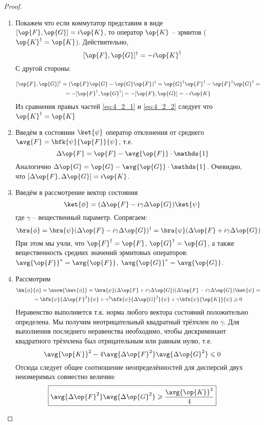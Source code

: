 \begin{proof}
\begin{enumerate}
\item Покажем что если коммутатор представим в виде $[\op{F},\op{G}]=i\op{K}$, то оператор $\op{K}$ -- эрмитов ($\op{K}^\dag=\op{K}$). Действительно,
\begin{equation}
  \label{eq:4_2_1}
  [\op{F},\op{G}]^\dag=-i\op{K}^\dag
\end{equation}%
%
С другой стороны:

\begin{equation}
\begin{gathered}
  \label{eq:4_2_2}
  [\op{F},\op{G}]^\dag= (\op{F}\op{G} - \op{G}\op{F})^\dag =
    \op{G}^\dag \op{F}^\dag - \op{F}^\dag \op{G}^\dag = \\ =
    -[\op{F}^\dag,\op{G}^\dag]= -[\op{F},\op{G}]= -i\op{K}
\end{gathered}
\end{equation}%
%
Из сравнения правых частей \eqref{eq:4_2_1} и \eqref{eq:4_2_2} следует что $\op{K}^\dag=\op{K}$

\item Введём в состоянии $\ket{\psi}$ оператор отклонения от среднего $\avg{F}=\bfk{\psi}{\op{F}}{\psi}$, т.е.
%
$$
  \Delta\op{F}=\op{F}-\avg{\op{F}}\cdot\mathds{1}
$$%
%
Аналогично $\Delta\op{G} = \op{G} - \avg{\op{G}} \cdot \mathds{1}$. Очевидно, что $[\Delta\op{F}, \Delta\op{G}] = i\op{K}$.

\item Введём в рассмотрение вектор состояния
$$
  \ket{\phi}=(\Delta\op{F}-i\gamma\Delta\op{G})\ket{\psi}
$$%
%
где $\gamma$ -- вещественный параметр. Сопрягаем:
$$
  \bra{\phi} = \bra{\psi} (\Delta\op{F} - i\gamma\Delta\op{G})^\dag =
    \bra{\psi} (\Delta\op{F} + i\gamma\Delta\op{G})
$$%
%
При этом мы учли, что $\op{F}^\dag = \op{F}$, $\op{G}^\dag = \op{G}$, а также вещественность средних значений эрмитовых операторов: $\avg{\op{F}}^* = \avg{\op{F}}$, $\avg{\op{G}}^* = \avg{\op{G}}$.

\item Рассмотрим
$$
\begin{gathered}
  \bk{\phi}{\phi} = \norm{\ket{\phi}} =
    \bra{\psi}(\Delta\op{F} + i\gamma\Delta\op{G})
        (\Delta\op{F} - i\gamma\Delta\op{G})\ket{\psi} = \\ =
    \bfk{\psi}{\Delta\op{F}^2}{\psi} + \gamma^2\bfk{\psi}{\Delta\op{G}^2}{\psi} +
      \gamma\bfk{\psi}{\op{K}}{\psi} \geqslant 0
\end{gathered}
$$%
%
Неравенство выполняется т.к. норма любого вектора состояний положительно определена. Мы получим неотрицательный квадратный трёхчлен по $\gamma$. Для выполнения последнего неравенства необходимо, чтобы дискриминант квадратного трёхчлена был отрицательным или равным нулю, т.е.
$$
  \avg{\op{K}}^2 - 4 \avg{\Delta\op{F}^2} \avg{\Delta\op{G}^2} \leqslant 0
$$%
%
Отсюда следует общее соотношение неопределённостей для дисперсий двух неизмеримых совместно величин:
$$
  \boxed{
    \avg{\Delta\op{F}^2} \avg{\Delta\op{G}^2} \geqslant \frac{\avg{\op{K}}^2}{4}
  }
$$


\end{enumerate}
\end{proof}
